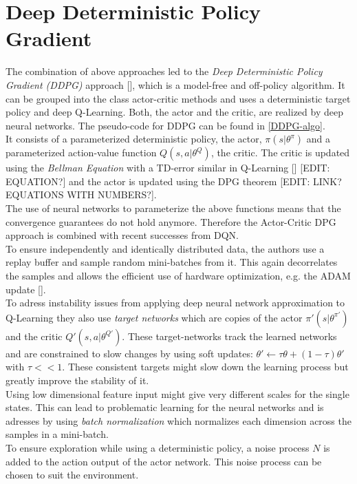 \section{Deep Deterministic Policy Gradient}
\label{sec:DDPG}
\nocite{lillicrap2015continuous}
The combination of above approaches led to the \textit{Deep Deterministic Policy Gradient (DDPG)} approach [\cite{lillicrap2015continuous}], which is a model-free and off-policy algorithm. It can be grouped into the class actor-critic methods and uses a deterministic target policy and deep Q-Learning. Both, the actor and the critic, are realized by deep neural networks. The pseudo-code for DDPG can be found in \ref{DDPG-algo}.\\
It consists of a parameterized deterministic policy, the actor, $\pi(s|\theta^\pi)$ and a parameterized action-value function $Q(s,a|\theta^Q)$, the critic. The critic is updated using the \textit{Bellman Equation} with a TD-error similar in Q-Learning [\cite{watkins1992q}] [EDIT: EQUATION?] and the actor is updated using the DPG theorem [EDIT: LINK? EQUATIONS WITH NUMBERS?].\\
The use of neural networks to parameterize the above functions means that the convergence guarantees do not hold anymore. Therefore the Actor-Critic DPG approach is combined with recent successes from DQN.\\
To ensure independently and identically distributed data, the authors use a replay buffer and sample random mini-batches from it. This again decorrelates the samples and allows the efficient use of hardware optimization, e.g. the ADAM update [\cite{kingma2014adam}].\\
To adress instability issues from applying deep neural network approximation to Q-Learning they also use \textit{target networks} which are copies of the actor $\pi'(s|\theta^{\pi'})$ and the critic $Q'(s,a|\theta^{Q'})$. These target-networks track the learned networks and are constrained to slow changes by using soft updates: $\theta' \leftarrow \tau\theta + (1-\tau)\theta'$ with $\tau << 1$. These consistent targets might slow down the learning process but greatly improve the stability of it.\\
Using low dimensional feature input might give very different scales for the single states. This can lead to problematic learning for the neural networks and is adresses by using \textit{batch normalization} which normalizes each dimension across the samples in a mini-batch.\\
To ensure exploration while using a deterministic policy, a noise process $\mathit{N}$ is added to the action output of the actor network. This noise process can be chosen to suit the environment. 
